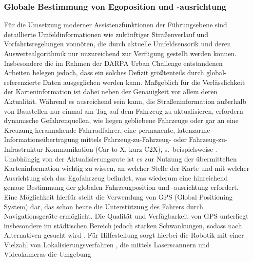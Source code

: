 \subsubsection{Globale Bestimmung von Egoposition und -ausrichtung} \label{sec:globalelok}
Für die Umsetzung moderner Assistenzfunktionen der Führungsebene sind detaillierte Umfeldinformationen wie zukünftiger Straßenverlauf und Vorfahrtsregelungen vonnöten, die durch aktuelle Umfeldsensorik und deren Auswertealgorithmik nur unzureichend zur Verfügung gestellt werden können. Insbesondere die im Rahmen der DARPA Urban Challenge entstandenen Arbeiten  \cite{urmson2008adu, montemerlo2008junior, bacha2008odin, jfr2008} belegen jedoch, dass ein solches Defizit größtenteils durch global-referenzierte Daten ausgeglichen werden kann. Maßgeblich für die Verlässlichkeit der Karteninformation ist dabei neben der Genauigkeit vor allem deren Aktualität. Während es ausreichend sein kann, die Straßeninformation außerhalb von Baustellen nur einmal am Tag auf dem Fahrzeug zu aktualisieren, erfordern dynamische Gefahrenquellen, wie liegen gebliebene Fahrzeuge oder gar an eine Kreuzung herannahende Fahrradfahrer, eine permanente, latenzarme Informationsübertragung mittels Fahrzeug-zu-Fahrzeug- oder Fahrzeug-zu-Infrastruktur-Kommunikation (Car-to-X, kurz C2X), s.\ beispielsweise . \\
Unabhängig von der Aktualisierungsrate ist es zur Nutzung der übermittelten Karteninformation wichtig zu wissen, an welcher Stelle der Karte und mit welcher Ausrichtung sich das Egofahrzeug befindet, was wiederum eine hinreichend genaue Bestimmung der globalen Fahrzeugposition und -ausrichtung erfordert. \\
Eine Möglichkeit hierfür stellt die Verwendung von GPS (Global Positioning System) dar, das  
schon heute die Unterstützung des Fahrers durch Navigationsgeräte ermöglicht. Die Qualität und Verfügbarkeit von GPS unterliegt insbesondere im städtischen Bereich jedoch starken Schwankungen, sodass nach Alternativen gesucht wird 
\cite{pink2010bildbasierte, geiger2012we,levinson2010robust}. Für Hilfestellung sorgt hierbei die Robotik mit einer Vielzahl 
von Lokalisierungsverfahren \cite{borenstein1997}, die mittels Laserscannern  und Videokameras \cite{lategahn2013mapping} die Umgebung 
